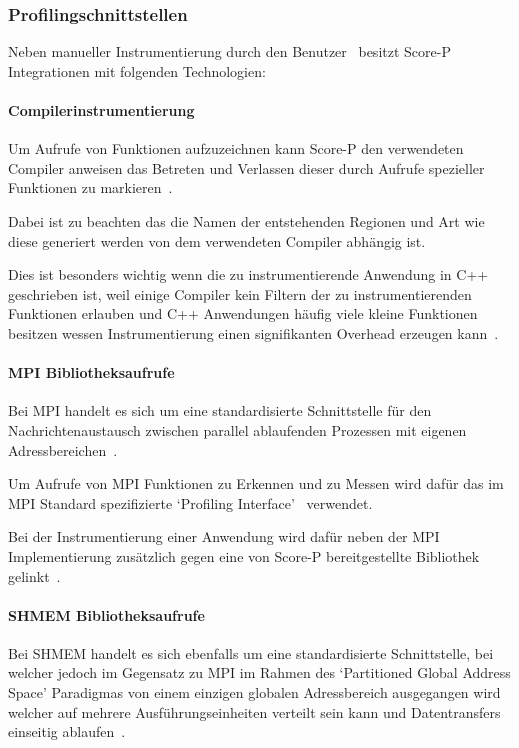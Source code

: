 \documentclass[german,proseminar,hyperref,utf8,lof]{zihpub}
\begin{document}
    \subsubsection{Profilingschnittstellen}
    Neben manueller Instrumentierung durch den Benutzer~
    besitzt Score-P Integrationen mit folgenden Technologien:

    \paragraph{Compilerinstrumentierung}
    Um Aufrufe von Funktionen aufzuzeichnen kann Score-P den verwendeten Compiler
    anweisen das Betreten und Verlassen dieser durch Aufrufe spezieller Funktionen
    zu markieren~.

    Dabei ist zu beachten das die Namen der entstehenden Regionen und Art wie diese generiert
    werden von dem verwendeten Compiler abhängig ist.

    Dies ist besonders wichtig wenn die zu instrumentierende Anwendung in C++ geschrieben ist,
    weil einige Compiler kein Filtern der zu instrumentierenden Funktionen erlauben und C++
    Anwendungen häufig viele kleine Funktionen besitzen wessen Instrumentierung einen signifikanten
    Overhead erzeugen kann~.

    \paragraph{MPI Bibliotheksaufrufe}
    Bei MPI handelt es sich um eine standardisierte Schnittstelle für den Nachrichtenaustausch
    zwischen parallel ablaufenden Prozessen mit eigenen Adressbereichen~.

    Um Aufrufe von MPI Funktionen zu Erkennen und zu Messen wird dafür das im MPI Standard
    spezifizierte `Profiling Interface'~ verwendet.

    Bei der Instrumentierung einer Anwendung wird dafür neben der MPI Implementierung zusätzlich
    gegen eine von Score-P bereitgestellte Bibliothek gelinkt~.

    \paragraph{SHMEM Bibliotheksaufrufe}
    Bei SHMEM handelt es sich ebenfalls um eine standardisierte Schnittstelle, bei welcher jedoch
    im Gegensatz zu MPI im Rahmen des `Partitioned Global Address Space' Paradigmas von einem
    einzigen globalen Adressbereich ausgegangen wird welcher auf mehrere Ausführungseinheiten
    verteilt sein kann und Datentransfers einseitig ablaufen~.
\end{document}
